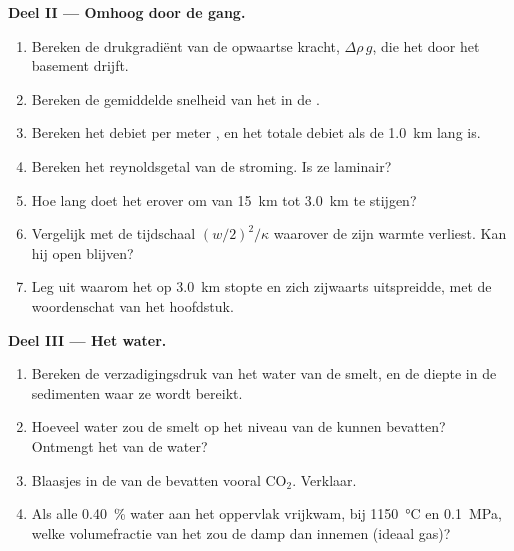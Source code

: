 \begin{problem}
\noindent\textbf{Deel II --- Omhoog door de gang.}
\begin{enumerate}[resume]
\item Bereken de drukgradiënt van de opwaartse kracht, $\Delta\rho\,g$, die het 
door het basement drijft.
\item Bereken de gemiddelde snelheid van het  in de .
\item Bereken het debiet per meter , en het totale debiet als de 
\qty{1.0}{km} lang is.
\item Bereken het reynoldsgetal van de stroming. Is ze laminair?
\item Hoe lang doet het  erover om van \qty{15}{km} tot \qty{3.0}{km} te stijgen?
\item Vergelijk met de tijdschaal $(w/2)^2/\kappa$ waarover de  zijn
warmte verliest. Kan hij open blijven?
\item Leg uit waarom het  op \qty{3.0}{km} stopte en zich zijwaarts uitspreidde, met
de woordenschat van het hoofdstuk.
\end{enumerate}

\noindent\textbf{Deel III --- Het water.}
\begin{enumerate}[resume]
\item Bereken de verzadigingsdruk van het water van de smelt, en de diepte in de
sedimenten waar ze wordt bereikt.
\item Hoeveel water zou de smelt op het niveau van de  kunnen bevatten? Ontmengt het
 van de  water?
\item Blaasjes in de  van de  bevatten vooral CO$_2$. Verklaar.
\item Als alle \qty{0.40}{\percent} water aan het oppervlak vrijkwam, bij
\qty{1150}{\celsius} en \qty{0.1}{MPa}, welke volumefractie van het  zou
de damp dan innemen (ideaal gas)?
\end{enumerate}


\end{problem}
